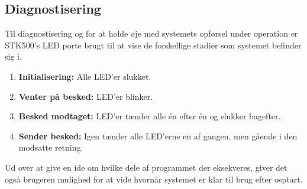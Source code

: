 \subsection{Diagnostisering}
Til diagnostisering og for at holde øje med systemets opførsel under operation er STK500's LED porte brugt til at vise de forskellige stadier som systemet befinder sig i.

\begin{enumerate}
	\item \textbf{Initialisering:} Alle LED'er slukket.
	\item \textbf{Venter på besked:} LED'er blinker.
	\item \textbf{Besked modtaget:} LED'er tænder alle én efter én og slukker bagefter.
	\item \textbf{Sender besked:} Igen tænder alle LED'erne en af gangen, men gående i den modsatte retning.
\end{enumerate}

Ud over at give en ide om hvilke dele af programmet der eksekveres, giver det også brugeren mulighed for at vide hvornår systemet er klar til brug efter osptart.
